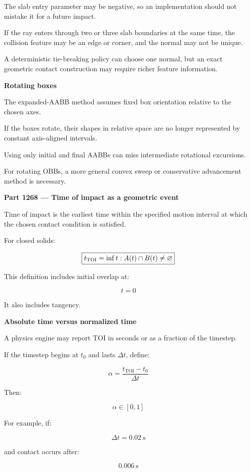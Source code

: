 The slab entry parameter may be negative, so an implementation should not mistake it for a future impact.

If the ray enters through two or three slab boundaries at the same time, the collision feature may be an edge or corner, and the normal may not be unique.

A deterministic tie-breaking policy can choose one normal, but an exact geometric contact construction may require richer feature information.

\textbf{Rotating boxes}

The expanded-AABB method assumes fixed box orientation relative to the chosen axes.

If the boxes rotate, their shapes in relative space are no longer represented by constant axis-aligned intervals.

Using only initial and final AABBs can miss intermediate rotational excursions.

For rotating OBBs, a more general convex sweep or conservative advancement method is necessary.

\textbf{Part 1268 --- Time of impact as a geometric event}

Time of impact is the earliest time within the specified motion interval at which the chosen contact condition is satisfied.

For closed solids:

\[
\boxed{ t_{\mathrm{TOI}}= \inf\\{t:A(t)\cap B(t)\ne\varnothing\\} }
\]

This definition includes initial overlap at:

\[
t=0
\]

It also includes tangency.

\textbf{Absolute time versus normalized time}

A physics engine may report TOI in seconds or as a fraction of the timestep.

If the timestep begins at \(t_0\) and lasts \(\Delta t\), define:

\[
\boxed{ \alpha=\frac{t_{\mathrm{TOI}}-t_0}{\Delta t} }
\]

Then:

\[
\alpha\in[0,1]
\]

For example, if:

\[
\Delta t=0.02\ \mathrm{s}
\]

and contact occurs after:

\[
0.006\ \mathrm{s}
\]

